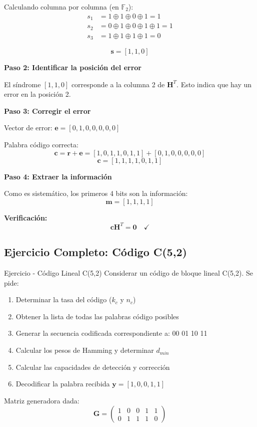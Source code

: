 \documentclass[10pt,a4paper]{article}
\begin{document}
\begin{solucion}
Calculando columna por columna (en $\mathbb{F}_2$):
\begin{align*}
s_1 &= 1 \oplus 1 \oplus 0 \oplus 1 = 1\\
s_2 &= 0 \oplus 1 \oplus 0 \oplus 1 \oplus 1 = 1\\
s_3 &= 1 \oplus 1 \oplus 1 \oplus 1 = 0
\end{align*}

\[
\mathbf{s} = [1, 1, 0]
\]

\textbf{Paso 2: Identificar la posición del error}

El síndrome $[1, 1, 0]$ corresponde a la columna 2 de $\mathbf{H}^T$. Esto indica que hay un error en la posición 2.

\textbf{Paso 3: Corregir el error}

Vector de error: $\mathbf{e} = [0, 1, 0, 0, 0, 0, 0]$

Palabra código correcta:
\[
\mathbf{c} = \mathbf{r} + \mathbf{e} = [1, 0, 1, 1, 0, 1, 1] + [0, 1, 0, 0, 0, 0, 0]
\]
\[
\boxed{\mathbf{c} = [1, 1, 1, 1, 0, 1, 1]}
\]

\textbf{Paso 4: Extraer la información}

Como es sistemático, los primeros 4 bits son la información:
\[
\boxed{\mathbf{m} = [1, 1, 1, 1]}
\]

\textbf{Verificación:}
\[
\mathbf{c} \mathbf{H}^T = \mathbf{0} \quad \checkmark
\]
\end{solucion}

\newpage
\subsection{Ejercicio Completo: Código C(5,2)}

\begin{ejercicio}{Ejercicio - Código Lineal C(5,2)}
Considerar un código de bloque lineal C(5,2). Se pide:
\begin{enumerate}
\item Determinar la tasa del código ($k_c$ y $n_c$)
\item Obtener la lista de todas las palabras código posibles
\item Generar la secuencia codificada correspondiente a: 00 01 10 11
\item Calcular los pesos de Hamming y determinar $d_{min}$
\item Calcular las capacidades de detección y corrección
\item Decodificar la palabra recibida $\mathbf{y} = [1, 0, 0, 1, 1]$
\end{enumerate}

Matriz generadora dada:
\[
\mathbf{G} = \begin{pmatrix}
1 & 0 & 0 & 1 & 1\\
0 & 1 & 1 & 1 & 0
\end{pmatrix}
\]
\end{ejercicio}
\end{document}

